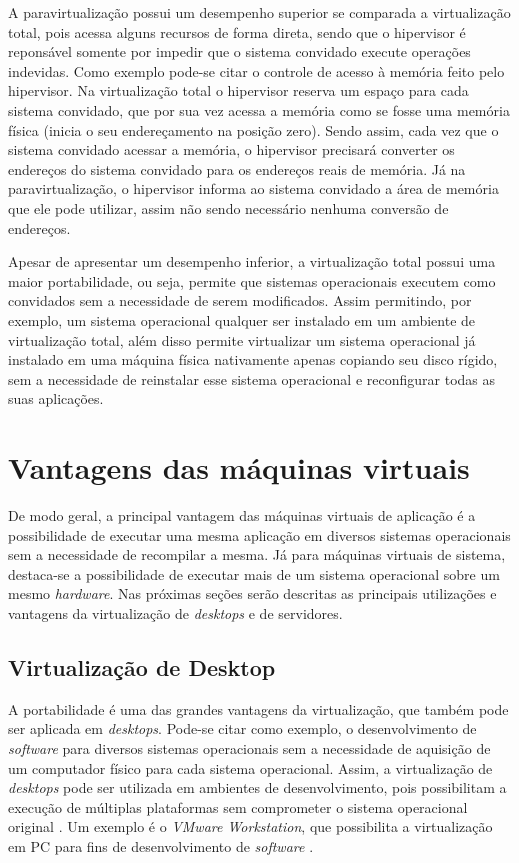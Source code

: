 A paravirtualização possui um desempenho superior se comparada a virtualização total, pois acessa alguns recursos de forma direta, sendo que 
o hipervisor é reponsável somente por impedir que o sistema convidado execute operações indevidas. Como exemplo pode-se citar o controle de
acesso à memória feito pelo hipervisor. Na virtualização total o hipervisor reserva um espaço para cada sistema convidado, que por sua vez 
acessa a memória como se fosse uma memória física (inicia o seu endereçamento na posição zero). Sendo assim, cada vez que o sistema convidado 
acessar a memória, o hipervisor precisará converter os endereços do sistema convidado para os endereços reais de memória. Já na paravirtualização, 
o hipervisor informa ao sistema convidado a área de memória que ele pode utilizar, assim não sendo necessário nenhuma conversão de endereços.

Apesar de apresentar um desempenho inferior, a virtualização total possui uma maior portabilidade, ou seja, permite que sistemas operacionais 
executem como convidados sem a necessidade de serem modificados. Assim permitindo, por exemplo, um sistema operacional qualquer ser instalado 
em um ambiente de virtualização total, além disso permite virtualizar um sistema operacional já instalado em uma máquina física nativamente 
apenas copiando seu disco rígido, sem a necessidade de reinstalar esse sistema operacional e reconfigurar todas as suas aplicações.

\section{Vantagens das máquinas virtuais}
\label{section:virtvantag}

De modo geral, a principal vantagem das máquinas virtuais de aplicação é a possibilidade de executar uma mesma aplicação em diversos sistemas 
operacionais sem a necessidade de recompilar a mesma. Já para máquinas virtuais de sistema, destaca-se a possibilidade de executar mais de um 
sistema operacional sobre um mesmo \textit{hardware}. Nas próximas seções serão descritas as principais utilizações e vantagens da virtualização 
de \textit{desktops} e de servidores.

\subsection{Virtualização de Desktop}
\label{section:virtdesk}

A portabilidade é uma das grandes vantagens da virtualização, que também pode ser aplicada em \textit{desktops}. Pode-se citar como exemplo, 
o desenvolvimento de \textit{software} para diversos sistemas operacionais sem a necessidade de aquisição de um computador físico para cada 
sistema operacional. Assim, a virtualização de \textit{desktops} pode ser utilizada em ambientes de desenvolvimento, pois possibilitam 
a execução de múltiplas plataformas sem comprometer o sistema operacional original \cite{carissimi2008}. Um exemplo é o 
\textit{VMware Workstation}, que possibilita a virtualização em \ac{PC} para fins de desenvolvimento de \textit{software} \cite{vmware2016}.

